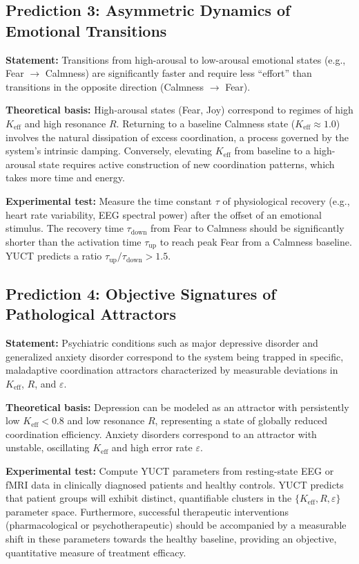 \documentclass[12pt,a4paper]{article}
\begin{document}
	\subsection{Prediction 3: Asymmetric Dynamics of Emotional Transitions}
	
	\textbf{Statement:} Transitions from high-arousal to low-arousal emotional states (e.g., Fear \(\rightarrow\) Calmness) are significantly faster and require less ``effort'' than transitions in the opposite direction (Calmness \(\rightarrow\) Fear).
	
	\textbf{Theoretical basis:} High-arousal states (Fear, Joy) correspond to regimes of high \(K_{\mathrm{eff}}\) and high resonance \(R\). Returning to a baseline Calmness state (\(K_{\mathrm{eff}} \approx 1.0\)) involves the natural dissipation of excess coordination, a process governed by the system's intrinsic damping. Conversely, elevating \(K_{\mathrm{eff}}\) from baseline to a high-arousal state requires active construction of new coordination patterns, which takes more time and energy.
	
	\textbf{Experimental test:} Measure the time constant \(\tau\) of physiological recovery (e.g., heart rate variability, EEG spectral power) after the offset of an emotional stimulus. The recovery time \(\tau_{\text{down}}\) from Fear to Calmness should be significantly shorter than the activation time \(\tau_{\text{up}}\) to reach peak Fear from a Calmness baseline. YUCT predicts a ratio \(\tau_{\text{up}}/\tau_{\text{down}} > 1.5\).
	
	\subsection{Prediction 4: Objective Signatures of Pathological Attractors}
	
	\textbf{Statement:} Psychiatric conditions such as major depressive disorder and generalized anxiety disorder correspond to the system being trapped in specific, maladaptive coordination attractors characterized by measurable deviations in \(K_{\mathrm{eff}}\), \(R\), and \(\varepsilon\).
	
	\textbf{Theoretical basis:} Depression can be modeled as an attractor with persistently low \(K_{\mathrm{eff}} < 0.8\) and low resonance \(R\), representing a state of globally reduced coordination efficiency. Anxiety disorders correspond to an attractor with unstable, oscillating \(K_{\mathrm{eff}}\) and high error rate \(\varepsilon\).
	
	\textbf{Experimental test:} Compute YUCT parameters from resting-state EEG or fMRI data in clinically diagnosed patients and healthy controls. YUCT predicts that patient groups will exhibit distinct, quantifiable clusters in the \(\{K_{\mathrm{eff}}, R, \varepsilon\}\) parameter space. Furthermore, successful therapeutic interventions (pharmacological or psychotherapeutic) should be accompanied by a measurable shift in these parameters towards the healthy baseline, providing an objective, quantitative measure of treatment efficacy.
	
\end{document}
